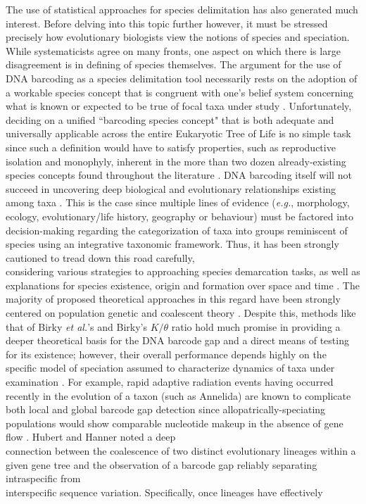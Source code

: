  

The use of statistical approaches for species delimitation has also generated much interest. Before delving into this topic further however, it must be stressed precisely how evolutionary biologists view the notions of species and speciation. While systematicists agree on many fronts, one aspect on which there is large disagreement is in defining of species themselves. The argument for the use of DNA barcoding as a species delimitation tool necessarily rests on the adoption of a workable species concept that is congruent with one's belief system concerning what is known or expected to be true of focal taxa under study \cite{miller2007dna, pante2015species, will2005perils}. Unfortunately, deciding on a unified ``barcoding species concept" that is both adequate and universally applicable across the entire Eukaryotic Tree of Life is no simple task since such a definition would have to satisfy properties, such as reproductive isolation and monophyly, inherent in the more than two dozen already-existing species concepts found throughout the literature \cite{dequeiroz2007species}. DNA barcoding itself will not succeed in uncovering deep biological and evolutionary relationships existing among taxa \cite{will2005perils}. This is the case since multiple lines of evidence (\textit{e.g.}, morphology, ecology, evolutionary/life history, geography or behaviour) must be factored into decision-making regarding the categorization of taxa into groups reminiscent of species using an integrative taxonomic framework. Thus, it has been strongly cautioned to tread down this road carefully, \\ considering various strategies to approaching species demarcation tasks, as well as \\ explanations for species existence, origin and formation over space and time \cite{carstens2013fail}. The majority of proposed theoretical approaches in this regard have been strongly centered on population genetic and coalescent theory \cite{kingman1982coalescent}. Despite this, methods like that of Birky \textit{et al.}'s \cite{birky2010using} and Birky's \cite{birky2013species} $K/\theta$ ratio hold much promise in providing a deeper theoretical basis for the DNA barcode gap and a direct means of testing for its existence; however, their overall performance depends highly on the specific model of speciation assumed to characterize dynamics of taxa under examination \cite{fujisawa2013delimiting, kapli2017multirate, monaghan2009accelerated, pons2006sequence, puillandre2011abgd, zhang2013general}. For example, rapid adaptive radiation events having occurred recently in the evolution of a taxon (such as Annelida) are known to complicate both local and global barcode gap detection since allopatrically-speciating populations would show comparable nucleotide makeup in the absence of gene flow \cite{kvist2017does}. Hubert and Hanner \cite{hubert2015dna} noted a deep \\ connection between the coalescence of two distinct evolutionary lineages within a given gene tree and the observation of a barcode gap reliably separating intraspecific from \\ interspecific sequence variation. Specifically, once lineages have effectively 